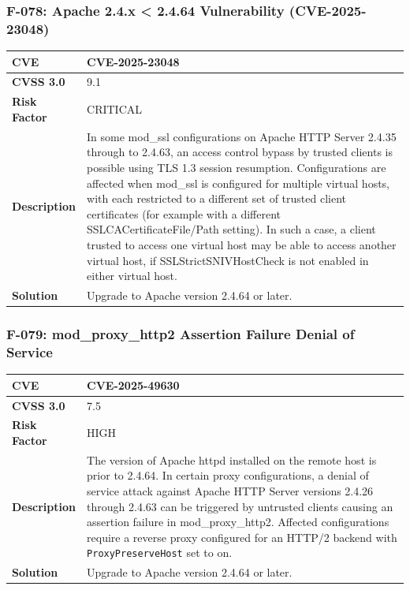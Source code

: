 \subsubsection{F-078: Apache 2.4.x < 2.4.64 Vulnerability (CVE-2025-23048)}
\begin{tabular}{|p{2.8cm}|p{12.2cm}|}
\hline
\textbf{CVE} & CVE-2025-23048 \\ \hline
\textbf{CVSS 3.0} & 9.1 \\ \hline
\textbf{Risk Factor} & CRITICAL \\ \hline
\textbf{Description} & In some mod\_ssl configurations on Apache HTTP Server 2.4.35 through to 2.4.63, an access control bypass by trusted clients is possible using TLS 1.3 session resumption. Configurations are affected when mod\_ssl is configured for multiple virtual hosts, with each restricted to a different set of trusted client certificates (for example with a different SSLCACertificateFile/Path setting). In such a case, a client trusted to access one virtual host may be able to access another virtual host, if SSLStrictSNIVHostCheck is not enabled in either virtual host. \\ \hline
\textbf{Solution} & Upgrade to Apache version 2.4.64 or later. \\ \hline
\end{tabular}

\subsubsection{F-079: mod\_proxy\_http2 Assertion Failure Denial of Service}
\begin{tabular}{|p{2.8cm}|p{12.2cm}|}
\hline
\textbf{CVE} & CVE-2025-49630 \\ \hline
\textbf{CVSS 3.0} & 7.5 \\ \hline
\textbf{Risk Factor} & HIGH \\ \hline
\textbf{Description} & The version of Apache httpd installed on the remote host is prior to 2.4.64. In certain proxy configurations, a denial of service attack against Apache HTTP Server versions 2.4.26 through 2.4.63 can be triggered by untrusted clients causing an assertion failure in mod\_proxy\_http2. Affected configurations require a reverse proxy configured for an HTTP/2 backend with \texttt{ProxyPreserveHost} set to on. \\ \hline
\textbf{Solution} & Upgrade to Apache version 2.4.64 or later. \\ \hline
\end{tabular}

